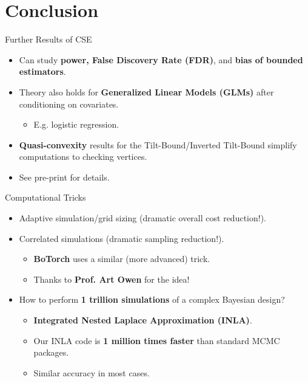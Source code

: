 \section{Conclusion}
\frame{\tableofcontents[currentsection]}

\begin{frame}{Further Results of CSE}
\begin{itemize}
    \item Can study \textbf{power, False Discovery Rate (FDR)}, and \textbf{bias of bounded estimators}.
    \item Theory also holds for \textbf{Generalized Linear Models (GLMs)} after conditioning on covariates.
    \begin{itemize}
        \item E.g. logistic regression.
    \end{itemize}
    \item \textbf{Quasi-convexity} results for the Tilt-Bound/Inverted Tilt-Bound simplify computations to checking vertices.
    \item See pre-print for details.
\end{itemize} 
\end{frame}

\begin{frame}{Computational Tricks}
    \begin{itemize}

    \item Adaptive simulation/grid sizing (dramatic overall cost reduction!).

    \item Correlated simulations (dramatic sampling reduction!). 
    \begin{itemize}
        \item \textbf{BoTorch} uses a similar (more advanced) trick.
        \item Thanks to \textbf{Prof. Art Owen} for the idea!
    \end{itemize}
    
    \item How to perform \textbf{1 trillion simulations} of a complex Bayesian design? 
    \begin{itemize}
        \item \textbf{Integrated Nested Laplace Approximation (INLA)}.
        \item Our INLA code is \textbf{1 million times faster} than standard MCMC packages.
        \item Similar accuracy in most cases.
    \end{itemize}

    \end{itemize}
\end{frame}

